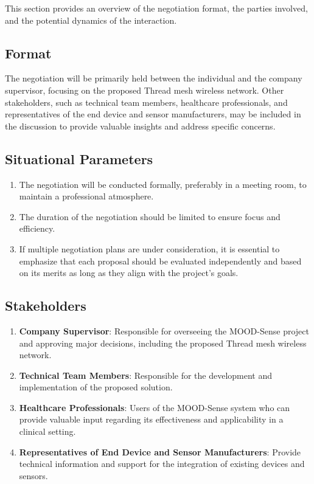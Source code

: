 This section provides an overview of the negotiation format, the parties involved, and the potential dynamics of the interaction.

\subsection*{Format}
The negotiation will be primarily held between the individual and the company supervisor, focusing on the proposed Thread mesh wireless network. Other stakeholders, such as technical team members, healthcare professionals, and representatives of the end device and sensor manufacturers, may be included in the discussion to provide valuable insights and address specific concerns.

\subsection*{Situational Parameters}

\begin{enumerate}
    \item The negotiation will be conducted formally, preferably in a meeting room, to maintain a professional atmosphere.
    \item The duration of the negotiation should be limited to ensure focus and efficiency.
    \item If multiple negotiation plans are under consideration, it is essential to emphasize that each proposal should be evaluated independently and based on its merits as long as they align with the project's goals.
\end{enumerate}

\subsection*{Stakeholders}

\begin{enumerate}
    \item \textbf{Company Supervisor}: Responsible for overseeing the MOOD-Sense project and approving major decisions, including the proposed Thread mesh wireless network.
    \item \textbf{Technical Team Members}: Responsible for the development and implementation of the proposed solution.
    \item \textbf{Healthcare Professionals}: Users of the MOOD-Sense system who can provide valuable input regarding its effectiveness and applicability in a clinical setting.
    \item \textbf{Representatives of End Device and Sensor Manufacturers}: Provide technical information and support for the integration of existing devices and sensors.
\end{enumerate}

